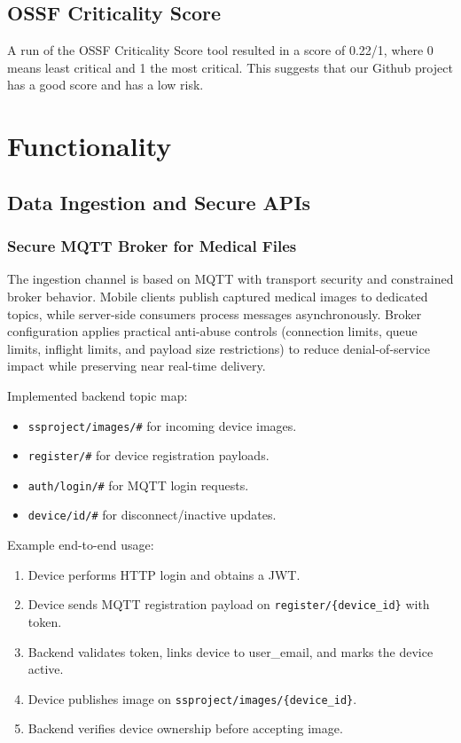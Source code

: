 \documentclass[12pt,a4paper]{article}
\begin{document}
\subsection{OSSF Criticality Score}
A run of the OSSF Criticality Score tool resulted in a score of 0.22/1, where 0
means least critical and 1 the most critical. This suggests that our Github
project has a good score and has a low risk.
\newpage


\section{Functionality}

\subsection{Data Ingestion and Secure APIs}
    \subsubsection{Secure MQTT Broker for Medical Files}
    The ingestion channel is based on MQTT with transport security and
    constrained broker behavior. Mobile clients publish captured medical images
    to dedicated topics, while server-side consumers process messages
    asynchronously. Broker configuration applies practical anti-abuse controls
    (connection limits, queue limits, inflight limits, and payload size
    restrictions) to reduce denial-of-service impact while preserving near
    real-time delivery.

    Implemented backend topic map:
    \begin{itemize}[leftmargin=*]
        \item \texttt{ssproject/images/\#} for incoming device images.
        \item \texttt{register/\#} for device registration payloads.
        \item \texttt{auth/login/\#} for MQTT login requests.
        \item \texttt{device/id/\#} for disconnect/inactive updates.
    \end{itemize}

    Example end-to-end usage:
    \begin{enumerate}[leftmargin=*]
        \item Device performs HTTP login and obtains a JWT.
        \item Device sends MQTT registration payload on
        \texttt{register/\{device\_id\}} with token.
        \item Backend validates token, links device to user\_email, and marks
        the device active.
        \item Device publishes image on
        \texttt{ssproject/images/\{device\_id\}}.
        \item Backend verifies device ownership before accepting image.
    \end{enumerate}
\end{document}
